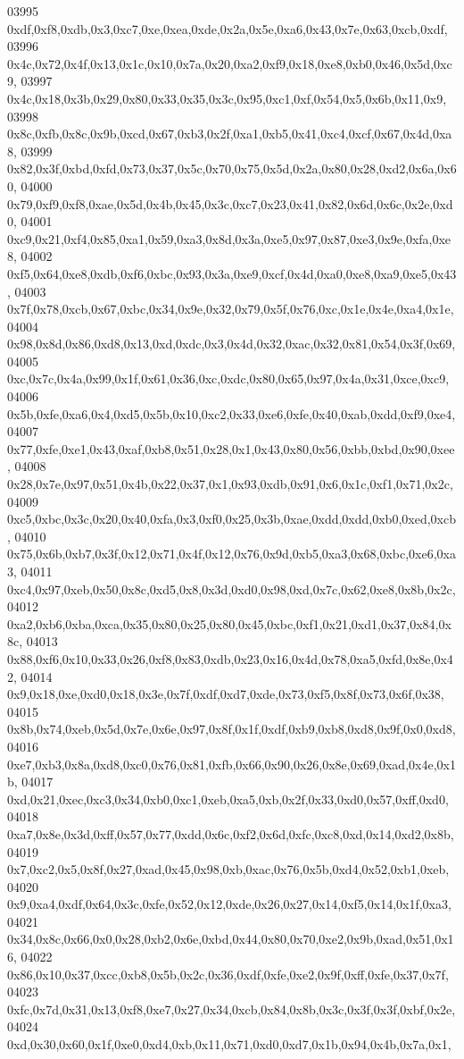 \begin{DoxyCode}
03995   0xdf,0xf8,0xdb,0x3,0xc7,0xe,0xea,0xde,0x2a,0x5e,0xa6,0x43,0x7e,0x63,0xcb,0xdf,
03996   0x4c,0x72,0x4f,0x13,0x1c,0x10,0x7a,0x20,0xa2,0xf9,0x18,0xe8,0xb0,0x46,0x5d,0xc9,
03997   0x4c,0x18,0x3b,0x29,0x80,0x33,0x35,0x3c,0x95,0xc1,0xf,0x54,0x5,0x6b,0x11,0x9,
03998   0x8c,0xfb,0x8c,0x9b,0xcd,0x67,0xb3,0x2f,0xa1,0xb5,0x41,0xc4,0xcf,0x67,0x4d,0xa8,
03999   0x82,0x3f,0xbd,0xfd,0x73,0x37,0x5c,0x70,0x75,0x5d,0x2a,0x80,0x28,0xd2,0x6a,0x60,
04000   0x79,0xf9,0xf8,0xae,0x5d,0x4b,0x45,0x3c,0xc7,0x23,0x41,0x82,0x6d,0x6c,0x2e,0xd0,
04001   0xc9,0x21,0xf4,0x85,0xa1,0x59,0xa3,0x8d,0x3a,0xe5,0x97,0x87,0xe3,0x9e,0xfa,0xe8,
04002   0xf5,0x64,0xe8,0xdb,0xf6,0xbc,0x93,0x3a,0xe9,0xcf,0x4d,0xa0,0xe8,0xa9,0xe5,0x43,
04003   0x7f,0x78,0xcb,0x67,0xbc,0x34,0x9e,0x32,0x79,0x5f,0x76,0xc,0x1e,0x4e,0xa4,0x1e,
04004   0x98,0x8d,0x86,0xd8,0x13,0xd,0xdc,0x3,0x4d,0x32,0xac,0x32,0x81,0x54,0x3f,0x69,
04005   0xc,0x7c,0x4a,0x99,0x1f,0x61,0x36,0xc,0xdc,0x80,0x65,0x97,0x4a,0x31,0xce,0xc9,
04006   0x5b,0xfe,0xa6,0x4,0xd5,0x5b,0x10,0xc2,0x33,0xe6,0xfe,0x40,0xab,0xdd,0xf9,0xe4,
04007   0x77,0xfe,0xe1,0x43,0xaf,0xb8,0x51,0x28,0x1,0x43,0x80,0x56,0xbb,0xbd,0x90,0xee,
04008   0x28,0x7e,0x97,0x51,0x4b,0x22,0x37,0x1,0x93,0xdb,0x91,0x6,0x1c,0xf1,0x71,0x2c,
04009   0xc5,0xbc,0x3c,0x20,0x40,0xfa,0x3,0xf0,0x25,0x3b,0xae,0xdd,0xdd,0xb0,0xed,0xcb,
04010   0x75,0x6b,0xb7,0x3f,0x12,0x71,0x4f,0x12,0x76,0x9d,0xb5,0xa3,0x68,0xbc,0xe6,0xa3,
04011   0xc4,0x97,0xeb,0x50,0x8c,0xd5,0x8,0x3d,0xd0,0x98,0xd,0x7c,0x62,0xe8,0x8b,0x2c,
04012   0xa2,0xb6,0xba,0xca,0x35,0x80,0x25,0x80,0x45,0xbc,0xf1,0x21,0xd1,0x37,0x84,0x8c,
04013   0x88,0xf6,0x10,0x33,0x26,0xf8,0x83,0xdb,0x23,0x16,0x4d,0x78,0xa5,0xfd,0x8e,0x42,
04014   0x9,0x18,0xe,0xd0,0x18,0x3e,0x7f,0xdf,0xd7,0xde,0x73,0xf5,0x8f,0x73,0x6f,0x38,
04015   0x8b,0x74,0xeb,0x5d,0x7e,0x6e,0x97,0x8f,0x1f,0xdf,0xb9,0xb8,0xd8,0x9f,0x0,0xd8,
04016   0xe7,0xb3,0x8a,0xd8,0xc0,0x76,0x81,0xfb,0x66,0x90,0x26,0x8e,0x69,0xad,0x4e,0x1b,
04017   0xd,0x21,0xec,0xc3,0x34,0xb0,0xc1,0xeb,0xa5,0xb,0x2f,0x33,0xd0,0x57,0xff,0xd0,
04018   0xa7,0x8e,0x3d,0xff,0x57,0x77,0xdd,0x6c,0xf2,0x6d,0xfc,0xc8,0xd,0x14,0xd2,0x8b,
04019   0x7,0xc2,0x5,0x8f,0x27,0xad,0x45,0x98,0xb,0xac,0x76,0x5b,0xd4,0x52,0xb1,0xeb,
04020   0x9,0xa4,0xdf,0x64,0x3c,0xfe,0x52,0x12,0xde,0x26,0x27,0x14,0xf5,0x14,0x1f,0xa3,
04021   0x34,0x8c,0x66,0x0,0x28,0xb2,0x6e,0xbd,0x44,0x80,0x70,0xe2,0x9b,0xad,0x51,0x16,
04022   0x86,0x10,0x37,0xcc,0xb8,0x5b,0x2c,0x36,0xdf,0xfe,0xe2,0x9f,0xff,0xfe,0x37,0x7f,
04023   0xfc,0x7d,0x31,0x13,0xf8,0xe7,0x27,0x34,0xcb,0x84,0x8b,0x3c,0x3f,0x3f,0xbf,0x2e,
04024   0xd,0x30,0x60,0x1f,0xe0,0xd4,0xb,0x11,0x71,0xd0,0xd7,0x1b,0x94,0x4b,0x7a,0x1,

\end{DoxyCode}
